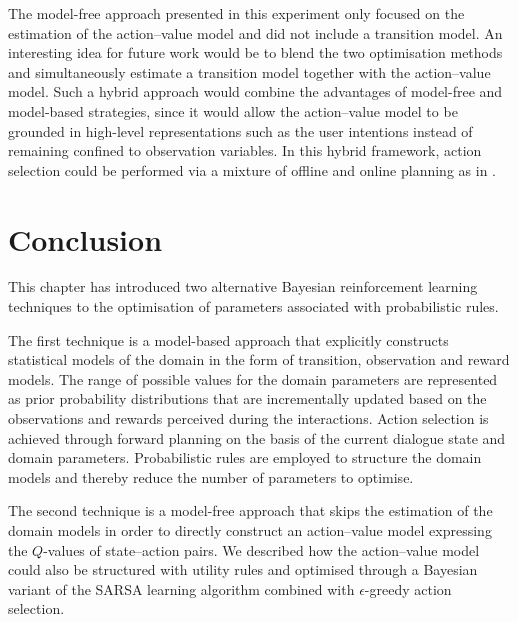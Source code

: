 
The model-free approach presented in this experiment only focused on the estimation of the action--value model and did not include a transition model.  An interesting idea for future work would be to blend the two optimisation methods and simultaneously estimate a transition model together with the action--value model.  Such a hybrid approach would combine the advantages of model-free and model-based strategies, since it would allow the action--value model to be grounded in high-level representations such as the user intentions instead of remaining confined to observation variables. In this hybrid framework, action selection could be performed via a mixture of offline and online planning as in \cite{RossC07}. 

\section{Conclusion}


This chapter has introduced two alternative Bayesian reinforcement learning techniques to the optimisation of parameters associated with probabilistic rules.

The first technique is a model-based approach that explicitly constructs statistical models of the domain in the form of transition, observation and reward models.  The range of possible values for the domain parameters are represented as prior probability distributions that are incrementally updated based on the observations and rewards perceived during the interactions. Action selection is achieved through forward planning on the basis of the current dialogue state and domain parameters. Probabilistic rules are employed to structure the domain models and thereby reduce the number of parameters to optimise. 

The second technique is a model-free approach that skips the estimation of the domain models in order to directly construct an action--value model expressing the $Q$-values of state--action pairs.  We described how the action--value model could also be structured with utility rules and optimised through a Bayesian variant of the SARSA learning algorithm combined with $\epsilon$-greedy action selection. 

